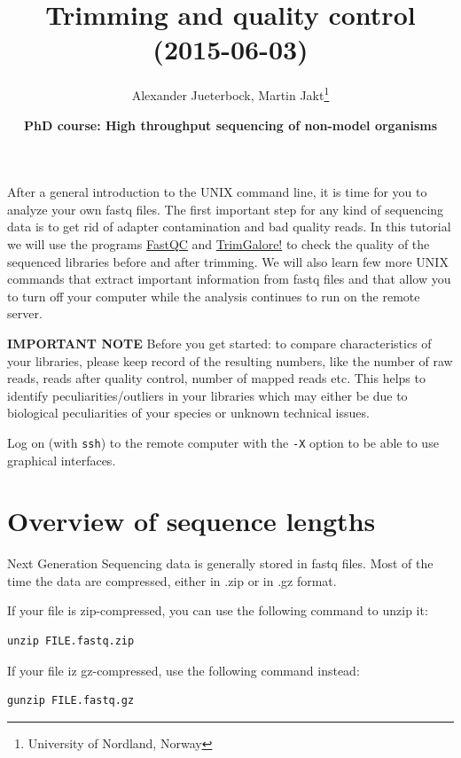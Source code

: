 \documentclass[11pt]{article}
\author{Alexander Jueterbock, Martin Jakt\thanks{University of Nordland, Norway}}
\date{\textbf{PhD course: High throughput sequencing of non-model organisms}}
\title{\textbf{Trimming and quality control} (2015-06-03)}
\begin{document}
\maketitle
\tableofcontents







After a general introduction to the UNIX command line, it is time for
you to analyze your own fastq files. The first important step for any
kind of sequencing data is to get rid of adapter contamination and 
bad quality reads. In this tutorial we will use the programs \href{http://www.bioinformatics.babraham.ac.uk/projects/fastqc/}{FastQC}
and \href{http://www.bioinformatics.babraham.ac.uk/projects/trim_galore/}{TrimGalore!} to check the quality of the sequenced libraries before
and after trimming. We will also learn few more UNIX commands that
extract important information from fastq files and that allow you to
turn off your computer while the analysis continues to run on the
remote server.


\textbf{IMPORTANT NOTE} Before you get started: to compare characteristics of
your libraries, please keep record of the resulting numbers, like the
number of raw reads, reads after quality control, number of mapped
reads etc. This helps to identify peculiarities/outliers in your
libraries which may either be due to biological peculiarities of your
species or unknown technical issues.


Log on (with \texttt{ssh}) to the remote computer with the \texttt{-X} option to be
able to use graphical interfaces.

\section{Overview of sequence lengths}
\label{sec-1}
Next Generation Sequencing data is generally stored in fastq
files. Most of the time the data are compressed, either in .zip or in
.gz format.

If your file is zip-compressed, you can use the following command to unzip it:

\begin{verbatim}
unzip FILE.fastq.zip
\end{verbatim}

If your file iz gz-compressed, use the following command instead:

\begin{verbatim}
gunzip FILE.fastq.gz
\end{verbatim}
\end{document}
